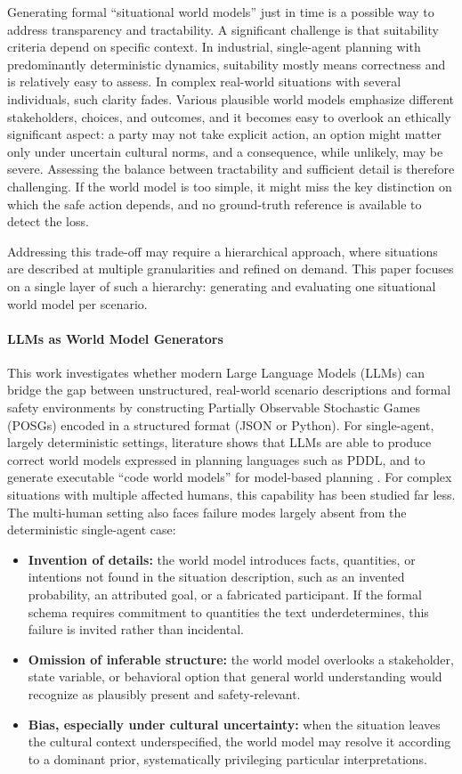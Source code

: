\documentclass{article}
\begin{document}
Generating formal ``situational world models'' just in time is a possible way to address transparency and tractability. A significant challenge is that suitability criteria depend on specific context. In industrial, single-agent planning with predominantly deterministic dynamics, suitability mostly means correctness and is relatively easy to assess. In complex real-world situations with several individuals, such clarity fades. Various plausible world models emphasize different stakeholders, choices, and outcomes, and it becomes easy to overlook an ethically significant aspect: a party may not take explicit action, an option might matter only under uncertain cultural norms, and a consequence, while unlikely, may be severe. Assessing the balance between tractability and sufficient detail is therefore challenging. If the world model is too simple, it might miss the key distinction on which the safe action depends, and no ground-truth reference is available to detect the loss.

Addressing this trade-off may require a hierarchical approach, where situations are described at multiple granularities and refined on demand. This paper focuses on a single layer of such a hierarchy: generating and evaluating one situational world model per scenario.

\paragraph{LLMs as World Model Generators}
This work investigates whether modern Large Language Models (LLMs) can bridge the gap between unstructured, real-world scenario descriptions and formal safety environments by constructing Partially Observable Stochastic Games (POSGs) encoded in a structured format (JSON or Python). For single-agent, largely deterministic settings, literature shows that LLMs are able to produce correct world models expressed in planning languages such as PDDL, and to generate executable ``code world models'' for model-based planning \citet{cao2025large,dainese2024generating}. For complex situations with multiple affected humans, this capability has been studied far less. The multi-human setting also faces failure modes largely absent from the deterministic single-agent case:
\begin{itemize}
    \item \textbf{Invention of details:} the world model introduces facts, quantities, or intentions not found in the situation description, such as an invented probability, an attributed goal, or a fabricated participant. If the formal schema requires commitment to quantities the text underdetermines, this failure is invited rather than incidental.
    \item \textbf{Omission of inferable structure:} the world model overlooks a stakeholder, state variable, or behavioral option that general world understanding would recognize as plausibly present and safety-relevant.
    \item \textbf{Bias, especially under cultural uncertainty:} when the situation leaves the cultural context underspecified, the world model may resolve it according to a dominant prior, systematically privileging particular interpretations.
\end{itemize}
\end{document}
